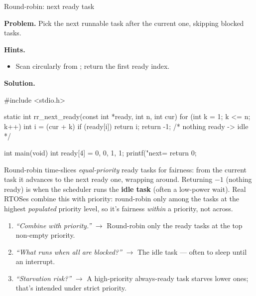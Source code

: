 \begin{gymproblem}{Round-robin: next ready task}

\textbf{Problem.} Pick the next runnable task after the current one, skipping
blocked tasks.

\textbf{Hints.}
\begin{itemize}
\item Scan circularly from ; return the first ready index.
\end{itemize}

\attempt

\textbf{Solution.}
\begin{cgym}
#include <stdio.h>

static int rr_next_ready(const int *ready, int n, int cur) {
    for (int k = 1; k <= n; k++) {
        int i = (cur + k) %
        if (ready[i]) return i;
    }
    return -1;                          /* nothing ready -> idle */
}

int main(void) {
    int ready[4] = {0, 0, 1, 1};
    printf("next=%
    return 0;
}
\end{cgym}

Round-robin time-slices \emph{equal-priority} ready tasks for fairness: from the
current task it advances to the next ready one, wrapping around. Returning $-1$
(nothing ready) is when the scheduler runs the \textbf{idle task} (often a
low-power wait). Real RTOSes combine this with priority: round-robin only among
the tasks at the highest \emph{populated} priority level, so it's fairness
\emph{within} a priority, not across.

\followups
\begin{enumerate}
\item \emph{``Combine with priority.''} $\rightarrow$ Round-robin only the
  ready tasks at the top non-empty priority.
\item \emph{``What runs when all are blocked?''} $\rightarrow$ The idle task ---
  often  to sleep until an interrupt.
\item \emph{``Starvation risk?''} $\rightarrow$ A high-priority always-ready
  task starves lower ones; that's intended under strict priority.
\end{enumerate}
\end{gymproblem}

